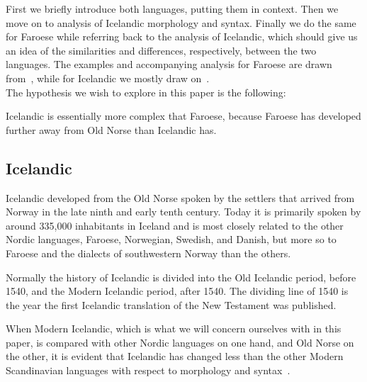 \documentclass[12pt,%
    times,
]{lin-v2/lin}
\begin{document}
First we briefly introduce both languages, putting them in context. Then we move on to analysis of Icelandic morphology and syntax.
Finally we do the same for Faroese while referring back to the analysis of Icelandic, which should give us an idea of
the similarities and differences, respectively, between the two languages.
The examples and accompanying analysis for Faroese are drawn from~\citep{faroese},
while for Icelandic we mostly draw on~\citep{icelandic}.\\


The hypothesis we wish to explore in this paper is the following:
\begin{exe}
    \ex
    Icelandic is essentially more complex that Faroese,
    because Faroese has developed further away from Old Norse than Icelandic has.
\end{exe}






\subsection{Icelandic}

Icelandic developed from the Old Norse spoken by the settlers that arrived from Norway
in the late ninth and early tenth century. Today it is primarily spoken by around 335,000
inhabitants in Iceland and is most closely related to the other Nordic languages, Faroese, Norwegian, Swedish, and Danish,
but more so to Faroese and the dialects of southwestern Norway than the others.

Normally the history of Icelandic is divided into the Old Icelandic period, before 1540,
and the Modern Icelandic period, after 1540. The dividing line of 1540 is the year
the first Icelandic translation of the New Testament was published.

When Modern Icelandic, which is what we will concern ourselves with in this paper,
is compared with other Nordic languages on one hand, and Old Norse on the other,
it is evident that Icelandic has changed less than the other
Modern Scandinavian languages with respect to morphology and
syntax~\citep{icelandic, germanicIcelandic}.
\end{document}
